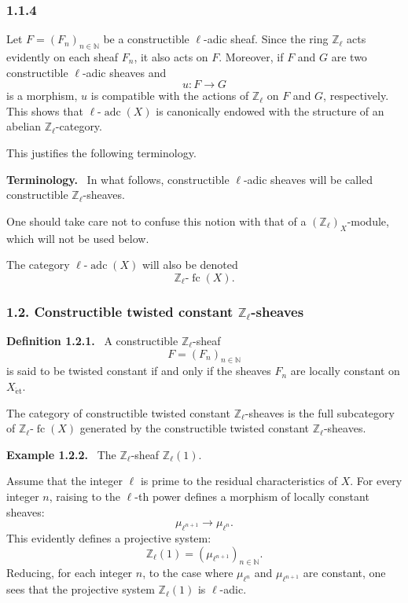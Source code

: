 \documentclass[11pt]{article}
\newenvironment{statement}[1]{\par\medskip\noindent\textbf{#1.}\ }{\par\medskip}
\providecommand{\fc}{\operatorname{fc}}
\providecommand{\adc}{\operatorname{adc}}
\begin{document}
\subsubsection*{1.1.4}
Let \(F=(F_n)_{n\in\mathbb N}\) be a constructible \(\ell\)-adic sheaf. Since the ring \(\mathbb Z_\ell\) acts evidently on each sheaf \(F_n\), it also acts on \(F\). Moreover, if \(F\) and \(G\) are two constructible \(\ell\)-adic sheaves and
\[
u:F\longrightarrow G
\]
is a morphism, \(u\) is compatible with the actions of \(\mathbb Z_\ell\) on \(F\) and \(G\), respectively. This shows that \(\ell\text{-}\adc(X)\) is canonically endowed with the structure of an abelian \(\mathbb Z_\ell\)-category.

This justifies the following terminology.

\begin{statement}{Terminology}
In what follows, constructible \(\ell\)-adic sheaves will be called constructible \(\mathbb Z_\ell\)-sheaves.
\end{statement}

One should take care not to confuse this notion with that of a \((\mathbb Z_\ell)_X\)-module, which will not be used below.

The category \(\ell\text{-}\adc(X)\) will also be denoted
\[
\mathbb Z_\ell\text{-}\fc(X).
\]

\subsubsection*{1.2. Constructible twisted constant \(\mathbb Z_\ell\)-sheaves}

\begin{statement}{Definition 1.2.1}
A constructible \(\mathbb Z_\ell\)-sheaf
\[
F=(F_n)_{n\in\mathbb N}
\]
is said to be twisted constant if and only if the sheaves \(F_n\) are locally constant on \(X_{\mathrm{\acute et}}\).
\end{statement}

The category of constructible twisted constant \(\mathbb Z_\ell\)-sheaves is the full subcategory of \(\mathbb Z_\ell\text{-}\fc(X)\) generated by the constructible twisted constant \(\mathbb Z_\ell\)-sheaves.

\begin{statement}{Example 1.2.2}
The \(\mathbb Z_\ell\)-sheaf \(\mathbb Z_\ell(1)\).
\end{statement}

Assume that the integer \(\ell\) is prime to the residual characteristics of \(X\). For every integer \(n\), raising to the \(\ell\)-th power defines a morphism of locally constant sheaves:
\[
\mu_{\ell^{n+1}}\longrightarrow \mu_{\ell^n}.
\]
This evidently defines a projective system:
\[
\mathbb Z_\ell(1)=(\mu_{\ell^{n+1}})_{n\in\mathbb N}.
\]
Reducing, for each integer \(n\), to the case where \(\mu_{\ell^n}\) and \(\mu_{\ell^{n+1}}\) are constant, one sees that the projective system \(\mathbb Z_\ell(1)\) is \(\ell\)-adic.
\end{document}

